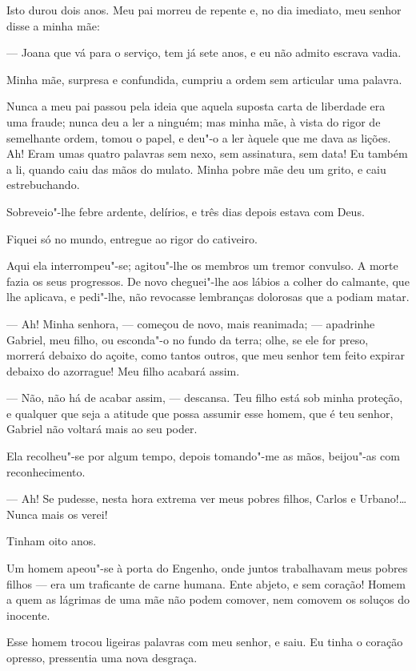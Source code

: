 Isto durou dois anos. Meu pai morreu de repente e, no dia imediato, meu
senhor disse a minha mãe:

--- Joana que vá para o serviço, tem já sete anos, e eu não admito
escrava vadia.

Minha mãe, surpresa e confundida, cumpriu a ordem sem articular uma
palavra.

Nunca a meu pai passou pela ideia que aquela suposta carta de liberdade
era uma fraude; nunca deu a ler a ninguém; mas minha mãe, à vista do
rigor de semelhante ordem, tomou o papel, e deu"-o a ler àquele que me
dava as lições. Ah! Eram umas quatro palavras sem nexo, sem assinatura,
sem data! Eu também a li, quando caiu das mãos do mulato. Minha pobre
mãe deu um grito, e caiu estrebuchando.

Sobreveio"-lhe febre ardente, delírios, e três dias depois estava com
Deus.

Fiquei só no mundo, entregue ao rigor do cativeiro.

Aqui ela interrompeu"-se; agitou"-lhe os membros um tremor convulso. A
morte fazia os seus progressos. De novo cheguei"-lhe aos lábios a colher
do calmante, que lhe aplicava, e pedi"-lhe, não revocasse lembranças
dolorosas que a podiam matar.

--- Ah! Minha senhora, --- começou de novo, mais reanimada; --- apadrinhe
Gabriel, meu filho, ou esconda"-o no fundo da terra; olhe, se ele for
preso, morrerá debaixo do açoite, como tantos outros, que meu senhor tem
feito expirar debaixo do azorrague! Meu filho acabará assim.

--- Não, não há de acabar assim, --- descansa. Teu filho está sob minha
proteção, e qualquer que seja a atitude que possa assumir esse homem,
que é teu senhor, Gabriel não voltará mais ao seu poder.

Ela recolheu"-se por algum tempo, depois tomando"-me as mãos, beijou"-as
com reconhecimento.

--- Ah! Se pudesse, nesta hora extrema ver meus pobres filhos, Carlos e
Urbano!\ldots{} Nunca mais os verei!

Tinham oito anos.

Um homem apeou"-se à porta do Engenho, onde juntos trabalhavam meus
pobres filhos --- era um traficante de carne humana. Ente abjeto, e sem
coração! Homem a quem as lágrimas de uma mãe não podem comover, nem
comovem os soluços do inocente.

Esse homem trocou ligeiras palavras com meu senhor, e saiu. Eu tinha o
coração opresso, pressentia uma nova desgraça.

